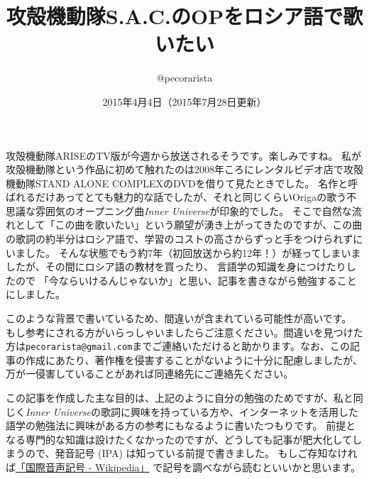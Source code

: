 \documentclass[12pt]{ltjsarticle}
\title{攻殻機動隊S.A.C.のOPをロシア語で歌いたい}
\author{@pecorarista}
\date{2015年4月4日（2015年7月28日更新）}
\begin{document}
\maketitle
攻殻機動隊ARISEのTV版が今週から放送されるそうです。楽しみですね。
私が攻殻機動隊という作品に初めて触れたのは2008年ころにレンタルビデオ店で攻殻機動隊STAND ALONE COMPLEXのDVDを借りて見たときでした。
名作と呼ばれるだけあってとても魅力的な話でしたが、それと同じくらいOrigaの歌う不思議な雰囲気のオープニング曲\textit{Inner Universe}\nocite{origa2011}が印象的でした。
そこで自然な流れとして「この曲を歌いたい」という願望が湧き上がってきたのですが、この曲の歌詞の約半分はロシア語で、学習のコストの高さからずっと手をつけられずにいました。
そんな状態でもう約7年（初回放送から約12年！）が経ってしまいましたが、その間にロシア語の教材を買ったり、
言語学の知識を身につけたりしたので 「今ならいけるんじゃないか」と思い、記事を書きながら勉強することにしました。

このような背景で書いているため、間違いが含まれている可能性が高いです。
もし参考にされる方がいらっしゃいましたらご注意ください。間違いを見つけた方は\texttt{pecorarista@gmail.com}までご連絡いただけると助かります。なお、この記事の作成にあたり、著作権を侵害することがないように十分に配慮しましたが、万が一侵害していることがあれば同連絡先にご連絡先ください。

この記事を作成した主な目的は、上記のように自分の勉強のためですが、私と同じく\textit{Inner Universe}の歌詞に興味を持っている方や、インターネットを活用した語学の勉強法に興味がある方の参考にもなるように書いたつもりです。
前提となる専門的な知識は設けたくなかったのですが、どうしても記事が肥大化してしまうので、発音記号 (IPA) は知っている前提で書きました。
もしご存知なければ\href{http://ja.wikipedia.org/wiki/%E5%9B%BD%E9%9A%9B%E9%9F%B3%E5%A3%B0%E8%A8%98%E5%8F%B7}{「国際音声記号 - Wikipedia」}
で記号を調べながら読むといいかと思います。
\end{document}

